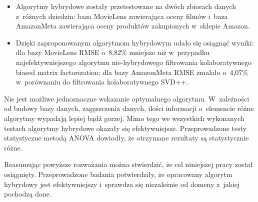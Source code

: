 \documentclass[twoside]{iisthesis}
\begin{document}
\begin{itemize}
		\item Algorytmy hybrydowe zostały przetestowane na dwóch zbiorach danych z~różnych dziedzin: baza MovieLens zawierająca oceny filmów i~baza AmazonMeta zawierająca oceny produktów zakupionych w~sklepie Amazon. 
		
		\item Dzięki zaproponowanym algorytmom hybrydowym udało się osiągnąć wyniki: dla bazy MovieLens RMSE o~8,82\% mniejsze niż w~przypadku najefektywniejszego algorytmu nie-hybrydowego filtrowania kolaboratywnego biased matrix factorization; dla bazy AmazonMeta RMSE zmalało o~4,07\% w~porównaniu do filtrowania kolaboratywnego SVD++. 
	\end{itemize}
		 	
	Nie jest możliwe jednoznaczne wskazanie optymalnego algorytmu. W~zależności od budowy bazy danych, zagęszczenia danych, ilości informacji o~elemencie różne algorytmy wypadają lepiej bądź gorzej.  Mimo tego we wszystkich wykonanych testach algorytmy hybrydowe okazały się efektywniejsze. Przeprowadzone testy statystyczne metodą ANOVA dowiodły, że otrzymane rezultaty są statystycznie różne.
	
	Reasumując powyższe rozważania można stwierdzić, że cel niniejszej pracy został osiągnięty. Przeprowadzone badania potwierdziły, że opracowany algorytm hybrydowy jest efektywniejszy i~sprawdza się niezależnie od domeny z~jakiej pochodzą dane. 

	



\clearpage




\end{document}
